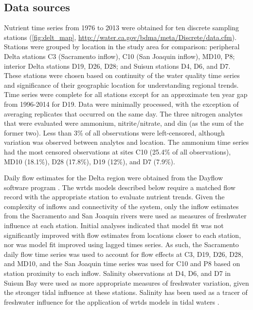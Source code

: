 \documentclass[journal = esthag, manuscript = article]{achemso}\usepackage[]{graphicx}\usepackage[]{color}
\begin{document}
\subsection{Data sources}



Nutrient time series from 1976 to 2013 were obtained for ten discrete sampling stations (\cref{fig:delt_map}, \url{http://water.ca.gov/bdma/meta/Discrete/data.cfm})\cite{IEP13}.  Stations were grouped by location in the study area for comparison: peripheral Delta stations C3 (Sacramento inflow), C10 (San Joaquin inflow), MD10, P8; interior Delta stations D19, D26, D28; and Suisun stations D4, D6, and D7.  These stations were chosen based on continuity of the water quality time series and significance of their geographic location for understanding regional trends.  Time series were complete for all stations except for an approximate ten year gap from 1996-2014 for D19.  Data were minimally processed, with the exception of averaging replicates that occurred on the same day.  The three nitrogen analytes that were evaluated were ammonium, nitrite/nitrate, and \ac{din} (as the sum of the former two). Less than 3\% of all observations were left-censored, although variation was observed between analytes and location.  The ammonium time series had the most censored observations at sites C10 (25.4\% of all observations), MD10 (18.1\%), D28 (17.8\%), D19 (12\%), and D7 (7.9\%).

Daily flow estimates for the Delta region were obtained from the Dayflow software program \cite{IEP16}. The \ac{wrtds} models described below require a matched flow record with the appropriate station to evaluate nutrient trends. Given the complexity of inflows and connectivity of the system, only the inflow estimates from the Sacramento and San Joaquin rivers were used as measures of freshwater influence at each station.  Initial analyses indicated that model fit was not significantly improved with flow estimates from locations closer to each station, nor was model fit improved using lagged times series.  As such, the Sacramento daily flow time series was used to account for flow effects at C3, D19, D26, D28, and MD10, and the San Joaquin time series was used for C10 and P8 based on station proximity to each inflow.  Salinity observations at D4, D6, and D7 in Suisun Bay were used as more appropriate measures of freshwater variation, given the stronger tidal influence at these stations.  Salinity has been used as a tracer of freshwater influence for the application of \ac{wrtds} models in tidal waters \cite{Beck15}.  
\end{document}
